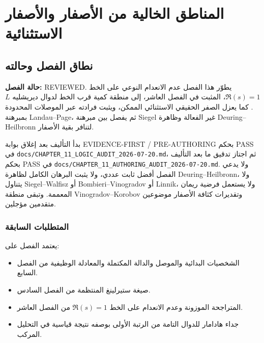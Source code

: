 \chapter{المناطق الخالية من الأصفار والأصفار الاستثنائية}

\section{نطاق الفصل وحالته}

\noindent\textbf{حالة الفصل:} \textenglish{REVIEWED}. يطوّر هذا الفصل عدم
الانعدام النوعي على الخط \(\Re(s)=1\)، المثبت في الفصل العاشر، إلى منطقة
كمية قرب الخط لدوال ديريشليه \(L\). كما يعزل الصفر الحقيقي الاستثنائي
الممكن، ويثبت فرادته عبر الموصلات المحدودة بمبرهنة Landau--Page، ثم يفصل
بين مبرهنة Siegel غير الفعالة وظاهرة Deuring--Heilbronn لتنافر بقية
الأصفار.

بدأ التأليف بعد إغلاق بوابة
\textenglish{EVIDENCE-FIRST / PRE-AUTHORING} بحكم \textenglish{PASS} في
\texttt{docs/CHAPTER\_11\_LOGIC\_AUDIT\_2026-07-20.md}، ثم اجتاز تدقيق
ما بعد التأليف بحكم \textenglish{PASS} في
\texttt{docs/CHAPTER\_11\_AUTHORING\_AUDIT\_2026-07-20.md}. ولا يدعي
الفصل أفضل ثابت عددي، ولا يثبت البرهان الكامل لظاهرة
Deuring--Heilbronn، ولا يتناول Siegel--Walfisz أو Bombieri--Vinogradov أو
Linnik، ولا يستعمل فرضية ريمان المعممة. وتبقى منطقة Vinogradov--Korobov
وتقديرات كثافة الأصفار موضوعين متقدمين مؤجلين.

\subsection{المتطلبات السابقة}

يعتمد الفصل على:
\begin{itemize}
  \item الشخصيات البدائية والموصل والدالة المكتملة والمعادلة الوظيفية من
  الفصل السابع.
  \item صيغة ستيرلينغ المنتظمة من الفصل السادس.
  \item المتراجحة الموزونة وعدم الانعدام على الخط \(\Re(s)=1\) من الفصل
  العاشر.
  \item جداء هادامار للدوال التامة من الرتبة الأولى بوصفه نتيجة قياسية في
  التحليل المركب.
\end{itemize}

